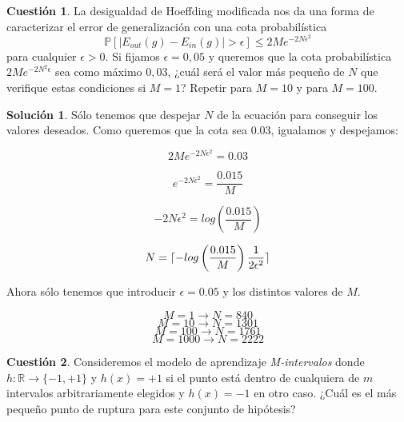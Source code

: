 \documentclass[a4paper, 11pt]{article}
\theoremstyle{definition}
\newtheorem{cuestion}{Cuestión}
\newtheorem*{solucion}{Solución}
\DeclarePairedDelimiter{\ceil}{\lceil}{\rceil}
\begin{document}
  \begin{cuestion}
  La desigualdad de Hoeffding modificada nos da una forma de caracterizar el error de generalización con una cota probabilística
  \[
  \mathds{P}[|E_{out}(g) - E_{in}(g)| > \epsilon] \leq 2Me^{-2N \epsilon^2}
  \]
  para cualquier $\epsilon > 0$. Si fijamos $\epsilon=0,05$ y queremos que la cota probabilística $2Me^{-2N^2 \epsilon}$ sea como máximo $0,03$, ¿cuál será el valor más pequeño de $N$ que verifique estas condiciones si $M=1$? Repetir para $M=10$ y para $M=100$.

  \end{cuestion}

  \begin{solucion}
    Sólo tenemos que despejar $N$ de la ecuación para conseguir los valores deseados. Como queremos que la cota sea $0.03$, igualamos y despejamos:

      \[
      2Me^{-2N\epsilon^2} = 0.03
      \]

      \[
      e^{-2N\epsilon^2} = \frac{0.015}{M}
      \]

      \[
      -2N\epsilon^2 = log\left(\frac{0.015}{M}\right)
      \]

      \[
      N = \ceil{-log\left(\frac{0.015}{M}\right) \frac{1}{2\epsilon^2}}
      \]

      Ahora sólo tenemos que introducir $\epsilon = 0.05$ y los distintos valores de $M$.

      $$M =  1 \rightarrow N =  840$$
      $$M =  10 \rightarrow N =  1301$$
      $$M =  100 \rightarrow N =  1761$$
      $$M =  1000 \rightarrow N =  2222$$

  \end{solucion}

  \begin{cuestion}
  Consideremos el modelo de aprendizaje \emph{M-intervalos} donde $h: \mathbb{R} \rightarrow \{-1, +1\}$ y $h(x)=+1$ si el punto está dentro de cualquiera de $m$ intervalos arbitrariamente elegidos y $h(x)=-1$ en otro caso. ¿Cuál es el más pequeño punto de ruptura para este conjunto de hipótesis?

  \end{cuestion}
\end{document}
